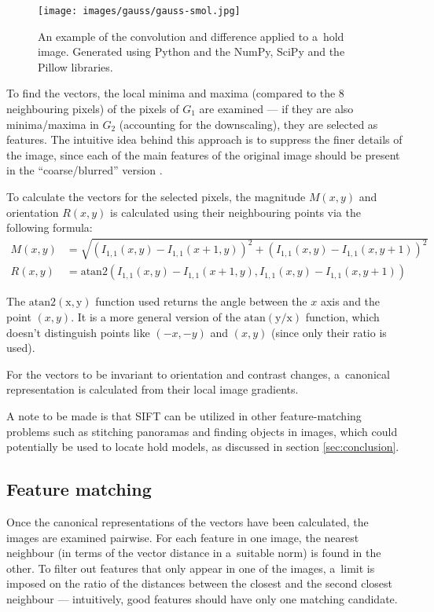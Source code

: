 \begin{figure}
	\centering
	\texttt{[image: images/gauss/gauss-smol.jpg]}
	\caption{An example of the convolution and difference applied to a~hold image. Generated using Python and the NumPy, SciPy and the Pillow libraries.}
	\label{fig:gaussexample}
\end{figure}

To find the vectors, the local minima and maxima (compared to the 8 neighbouring pixels) of the pixels of $G_1$ are examined --- if they are also minima/maxima in $G_2$ (accounting for the downscaling), they are selected as features.
The intuitive idea behind this approach is to suppress the finer details of the image, since each of the main features of the original image should be present in the ``coarse/blurred'' version \cite{scalespace}.

To calculate the vectors for the selected pixels, the magnitude $M(x,y)$ and orientation $R(x,y)$ is calculated using their neighbouring points via the following formula:
\begin{align}
	M(x,y) &= \sqrt{\left(I_{1,1}(x, y) - I_{1,1}(x + 1, y)\right)^2 + \left(I_{1,1}(x,y) - I_{1,1}(x, y + 1)\right)^2} \\[0.7em]
	R(x,y) &= \mathrm{atan2} \left(I_{1,1}(x, y) - I_{1,1}(x + 1, y), I_{1,1}(x,y) - I_{1,1}(x, y + 1)\right)
\end{align}

The $\mathrm{atan2(x, y)}$ function used returns the angle between the $x$ axis and the point $(x, y)$.
It is a more general version of the $\mathrm{atan(y/x)}$ function, which doesn't distinguish points like $(-x, -y)$ and $(x, y)$ (since only their ratio is used).

For the vectors to be invariant to orientation and contrast changes, a~canonical representation is calculated from their local image gradients.

A note to be made is that SIFT can be utilized in other feature-matching problems such as stitching panoramas and finding objects in images, which could potentially be used to locate hold models, as discussed in section \ref{sec:conclusion}.

\subsection{Feature matching}
Once the canonical representations of the vectors have been calculated, the images are examined pairwise.
For each feature in one image, the nearest neighbour (in terms of the vector distance in a~suitable norm) is found in the other.
To filter out features that only appear in one of the images, a~limit is imposed on the ratio of the distances between the closest and the second closest neighbour --- intuitively, good features should have only one matching candidate.

